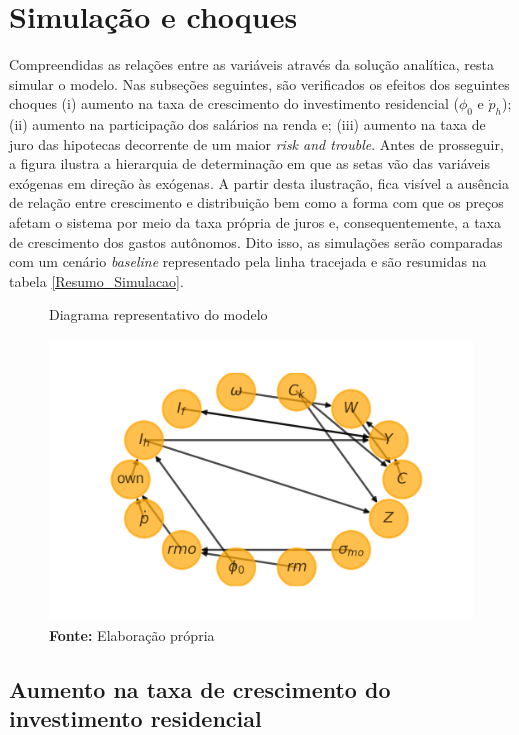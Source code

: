 \section{Simulação e choques}
\label{SecChoques}

Compreendidas as relações entre as variáveis através da solução analítica, resta simular o modelo. Nas subseções seguintes, são verificados os efeitos dos seguintes choques
(i) aumento na taxa de crescimento do investimento residencial ($\phi_0$ e $\dot p_h$); (ii) aumento na participação dos salários na renda e;  (iii) aumento na taxa de juro das hipotecas decorrente de um maior \textit{risk and trouble}. Antes de prosseguir, a figura \label{DAG} ilustra a hierarquia de determinação em que as setas vão das variáveis exógenas em direção às exógenas. A partir desta ilustração, fica visível a ausência de relação entre crescimento e distribuição bem como a forma com que os preços afetam o sistema por meio da taxa própria de juros e, consequentemente, a taxa de crescimento dos gastos autônomos. Dito isso, as simulações serão comparadas com um cenário \textit{baseline} representado pela linha tracejada e são resumidas na tabela \ref{Resumo_Simulacao}.

\begin{figure}[H]
	\centering
	\label{DAG}
	\caption{Diagrama representativo do modelo}
	\includegraphics[width=\textwidth]{../../Modelo/Versoes/Dag.png}
	\caption*{\textbf{Fonte:} Elaboração própria}
\end{figure}



\subsection*{Aumento na taxa de crescimento do investimento residencial}

